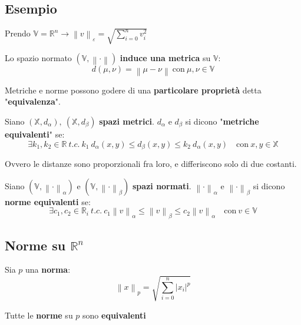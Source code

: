 \documentclass[a4paper, oneside]{article}
\newcommand\X{\mathbb{X}}
\newcommand\R{\mathbb{R}}
\newcommand\norma{\left\lVert\cdot\right\rVert}
\newcommand\V{\mathbb{V}}
\begin{document}
\subsection{Esempio}
Prendo $\displaystyle \V=\R^n \rightarrow \left\lVert v\right\rVert_\varepsilon = \sqrt{\sum_{i=0}^{n} v_i^2}$

\begin{proposition}
    Lo spazio normato $(\V,\norma)$ \textbf{induce una metrica} su $\V$:
    \[d(\mu,\nu)=\left\lVert \mu-\nu\right\rVert \ \text{con} \ \mu,\nu\in\V\]
\end{proposition}
\noindent Metriche e norme possono godere di una \textbf{particolare proprietà} detta "\textbf{equivalenza}".

\begin{definition}
    Siano $(\X,d_\alpha), \ (\X,d_\beta)$ \textbf{spazi metrici}. $d_\alpha$ e $d_\beta$ si dicono "\textbf{metriche equivalenti}" se:
    \[\exists k_1,k_2\in\R \ t.c. \ k_1 \ d_\alpha(x,y) \leq d_\beta(x,y) \leq k_2 \ d_\alpha(x,y) \quad \text{con} \ x,y\in\X\]
\end{definition}
\noindent Ovvero le distanze sono proporzionali fra loro, e differiscono solo di due costanti.\\
\begin{definition}
    Siano $(\V,\norma_\alpha)$ e $(\V,\norma_\beta)$ \textbf{spazi normati}. $\norma_\alpha$ e $\norma_\beta$ si dicono \textbf{norme equivalenti} se:
    \[\exists c_1,c_2\in\R_i \ t.c. \ c_1 \left\lVert v\right\rVert_\alpha \leq \left\lVert v\right\rVert_\beta \leq c_2 \left\lVert v\right\rVert_\alpha \quad \text{con} \ v\in\V\]
\end{definition}


\subsection{Norme su $\R^n$}
    Sia $p$ una \textbf{norma}:
    \[\left\lVert x\right\rVert_p = \sqrt{\sum_{i=0}^{n} |x_i|^p} \]

\begin{theorem}
    Tutte le \textbf{norme} su $p$ sono \textbf{equivalenti}
\end{theorem}
\end{document}
